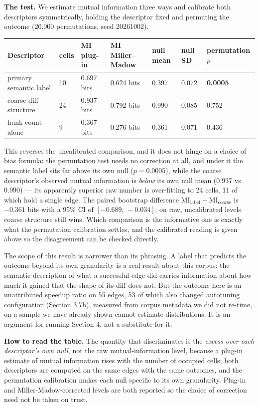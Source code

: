 \documentclass[
  11pt,
]{article}
\begin{document}
\textbf{The test.} We estimate mutual information three ways and calibrate both descriptors symmetrically, holding the descriptor fixed and permuting the outcome (20,000 permutations, seed 20261002).

\begin{longtable}[]{@{}lllllll@{}}
\toprule
Descriptor & cells & MI plug-in & MI Miller--Madow & null mean & null SD & permutation \(p\) \\
\midrule
\endhead
primary semantic label & 10 & 0.697 bits & 0.624 bits & 0.397 & 0.072 & \textbf{0.0005} \\
coarse diff structure & 24 & 0.937 bits & 0.792 bits & 0.990 & 0.085 & 0.752 \\
hunk count alone & 9 & 0.367 bits & 0.276 bits & 0.361 & 0.071 & 0.436 \\
\bottomrule
\end{longtable}

This reverses the uncalibrated comparison, and it does not hinge on a choice of bias formula: the permutation test needs no correction at all, and under it the semantic label sits far above its own null (\(p = 0.0005\)), while the coarse descriptor's observed mutual information is \emph{below} its own null mean (0.937 vs 0.990) --- its apparently superior raw number is over-fitting to 24 cells, 11 of which hold a single edge. The paired bootstrap difference \(\mathrm{MI}_{\text{label}} - \mathrm{MI}_{\text{coarse}}\) is \(-0.361\) bits with a 95\% CI of \([-0.689,\,-0.034]\): on raw, uncalibrated levels coarse structure still wins. Which comparison is the informative one is exactly what the permutation calibration settles, and the calibrated reading is given above so the disagreement can be checked directly.

The scope of this result is narrower than its phrasing. A label that predicts the outcome beyond its own granularity is a real result about this corpus: the semantic description of what a successful edge did carries information about how much it gained that the shape of its diff does not. But the outcome here is an unattributed speedup ratio on 55 edges, 53 of which also changed autotuning configuration (Section 3.7b), measured from corpus metadata we did not re-time, on a sample we have already shown cannot estimate distributions. It is an argument for running Section 4, not a substitute for it.

\textbf{How to read the table.} The quantity that discriminates is the \emph{excess over each descriptor's own null}, not the raw mutual-information level, because a plug-in estimate of mutual information rises with the number of occupied cells; both descriptors are computed on the same edges with the same outcomes, and the permutation calibration makes each null specific to its own granularity. Plug-in and Miller-Madow-corrected levels are both reported so the choice of correction need not be taken on trust.
\end{document}
